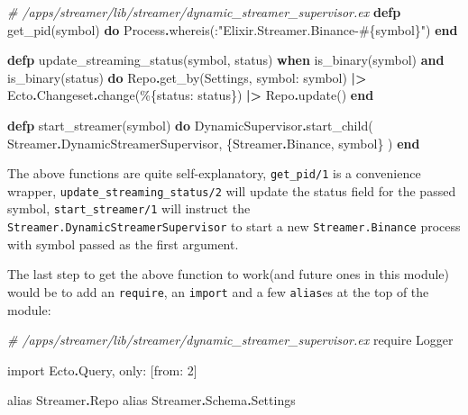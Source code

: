 \documentclass[
]{book}
\newenvironment{Shaded}{\begin{snugshade}}{\end{snugshade}}
\newcommand{\CommentTok}[1]{\textcolor[rgb]{0.56,0.35,0.01}{\textit{#1}}}
\newcommand{\ConstantTok}[1]{\textcolor[rgb]{0.00,0.00,0.00}{#1}}
\newcommand{\DecValTok}[1]{\textcolor[rgb]{0.00,0.00,0.81}{#1}}
\newcommand{\ImportTok}[1]{#1}
\newcommand{\KeywordTok}[1]{\textcolor[rgb]{0.13,0.29,0.53}{\textbf{#1}}}
\newcommand{\NormalTok}[1]{#1}
\newcommand{\OperatorTok}[1]{\textcolor[rgb]{0.81,0.36,0.00}{\textbf{#1}}}
\newcommand{\OtherTok}[1]{\textcolor[rgb]{0.56,0.35,0.01}{#1}}
\newcommand{\StringTok}[1]{\textcolor[rgb]{0.31,0.60,0.02}{#1}}
\newcommand{\VariableTok}[1]{\textcolor[rgb]{0.00,0.00,0.00}{#1}}
\begin{document}
\begin{Shaded}
\begin{Highlighting}[]
\CommentTok{\# /apps/streamer/lib/streamer/dynamic\_streamer\_supervisor.ex}
  \KeywordTok{defp}\NormalTok{ get\_pid(symbol) }\KeywordTok{do}
    \ConstantTok{Process}\OperatorTok{.}\NormalTok{whereis(:}\StringTok{"Elixir.Streamer.Binance{-}}\OtherTok{\#\{}\NormalTok{symbol}\OtherTok{\}}\StringTok{"}\NormalTok{)}
  \KeywordTok{end}

  \KeywordTok{defp}\NormalTok{ update\_streaming\_status(symbol, status)}
       \KeywordTok{when}\NormalTok{ is\_binary(symbol) }\KeywordTok{and}\NormalTok{ is\_binary(status) }\KeywordTok{do}
    \ConstantTok{Repo}\OperatorTok{.}\NormalTok{get\_by(}\ConstantTok{Settings}\NormalTok{, }\VariableTok{symbol:}\NormalTok{ symbol)}
    \OperatorTok{|\textgreater{}} \ConstantTok{Ecto}\OperatorTok{.}\ConstantTok{Changeset}\OperatorTok{.}\NormalTok{change(\%\{}\VariableTok{status:}\NormalTok{ status\})}
    \OperatorTok{|\textgreater{}} \ConstantTok{Repo}\OperatorTok{.}\NormalTok{update()}
  \KeywordTok{end}

  \KeywordTok{defp}\NormalTok{ start\_streamer(symbol) }\KeywordTok{do}
    \ConstantTok{DynamicSupervisor}\OperatorTok{.}\NormalTok{start\_child(}
      \ConstantTok{Streamer}\OperatorTok{.}\ConstantTok{DynamicStreamerSupervisor}\NormalTok{,}
\NormalTok{      \{}\ConstantTok{Streamer}\OperatorTok{.}\ConstantTok{Binance}\NormalTok{, symbol\}}
\NormalTok{    )}
  \KeywordTok{end}
\end{Highlighting}
\end{Shaded}

The above functions are quite self-explanatory, \texttt{get\_pid/1} is a convenience wrapper, \texttt{update\_streaming\_status/2} will update the status field for the passed symbol, \texttt{start\_streamer/1} will instruct the \texttt{Streamer.DynamicStreamerSupervisor} to start a new \texttt{Streamer.Binance} process with symbol passed as the first argument.

The last step to get the above function to work(and future ones in this module) would be to add an \texttt{require}, an \texttt{import} and a few \texttt{alias}es at the top of the module:

\begin{Shaded}
\begin{Highlighting}[]
\CommentTok{\# /apps/streamer/lib/streamer/dynamic\_streamer\_supervisor.ex}
  \ImportTok{require} \ConstantTok{Logger}

  \ImportTok{import} \ConstantTok{Ecto}\OperatorTok{.}\ConstantTok{Query}\NormalTok{, }\VariableTok{only:}\NormalTok{ [}\VariableTok{from:} \DecValTok{2}\NormalTok{]}

  \ImportTok{alias} \ConstantTok{Streamer}\OperatorTok{.}\ConstantTok{Repo}
  \ImportTok{alias} \ConstantTok{Streamer}\OperatorTok{.}\ConstantTok{Schema}\OperatorTok{.}\ConstantTok{Settings}
\end{Highlighting}
\end{Shaded}
\end{document}
